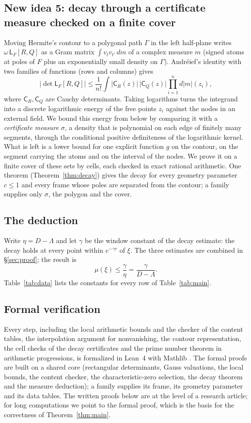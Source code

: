 \documentclass[11pt]{amsart}
\theoremstyle{definition}
\theoremstyle{remark}
\numberwithin{equation}{section}
\newcommand{\Lw}{\mathsf L}          %
\begin{document}
\subsection{New idea 5: decay through a certificate measure checked on a finite cover}
Moving Hermite's contour to a polygonal path $\Gamma$ in the left half-plane writes $\omega\,\Lw_F[R,Q]$ as a Gram matrix
$\int v_tv_{t'}\,dm$ of a complex measure $m$ (signed atoms at poles of $F$ plus an exponentially small density on
$\Gamma$). Andr\'eief's identity with two families of functions (rows and columns) gives
\[
 |\det\Lw_F[R,Q]|\le\frac1{n!}\int\bigl|\mathsf C_R(z)\bigr|\,\bigl|\mathsf C_Q(z)\bigr|\prod_{i=1}^nd|m|(z_i),
\]
where $\mathsf C_R,\mathsf C_Q$ are Cauchy determinants. Taking logarithms turns the integrand into a discrete
logarithmic energy of the free points $z_i$ against the nodes in an external field. We bound this energy from below by
comparing it with a \emph{certificate measure} $\sigma$, a density that is polynomial on each edge of finitely many
segments, through the conditional positive definiteness of the logarithmic kernel. What is left is a lower bound for
one explicit function $g$ on the contour, on the segment carrying the atoms and on the interval of the nodes. We prove
it on a finite cover of these sets by cells, each checked in exact rational arithmetic. One theorem
(Theorem~\ref{thm:decay}) gives the decay for every geometry parameter $c\le1$ and every frame whose poles are separated
from the contour; a family supplies only $\sigma$, the polygon and the cover.

\subsection{The deduction}
Write $\eta=D-\Lambda$ and let $\gamma$ be the window constant of the decay estimate: the decay holds at every point
within $e^{-\gamma r}$ of $\xi$. The three estimates are combined in \S\ref{sec:proof}; the result is
\[
 \mu(\xi)\le\frac\gamma\eta=\frac\gamma{D-\Lambda}.
\]
Table~\ref{tab:data} lists the constants for every row of Table~\ref{tab:main}.

\subsection{Formal verification}
Every step, including the local arithmetic bounds and the checker of the content tables, the interpolation argument
for nonvanishing, the contour representation, the cell checks of the decay certificates and the prime number theorem
in arithmetic progressions, is formalized in Lean~4 with Mathlib \cite{Lean4,Mathlib}. The formal proofs are built on
a shared core (rectangular determinants, Gauss valuations, the local bounds, the content checker, the
characteristic-zero selection, the decay theorem and the measure deduction); a family supplies its frame, its geometry
parameter and its data tables. The written proofs below are at the level of a research article; for long computations
we point to the formal proof, which is the basis for the correctness of Theorem~\ref{thm:main}.
\end{document}
